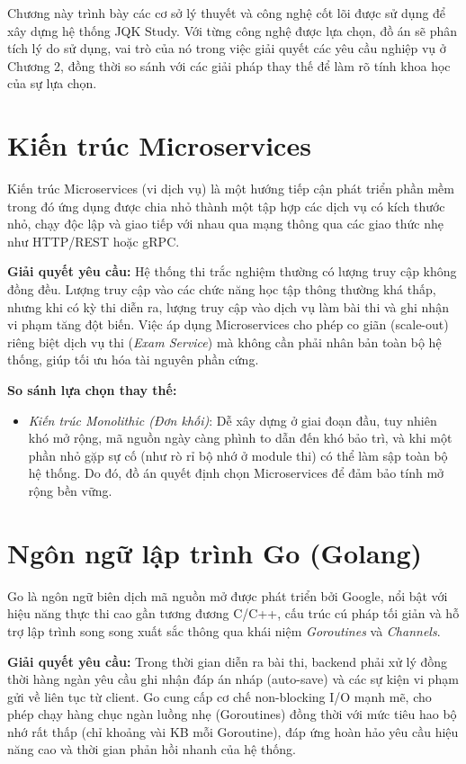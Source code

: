 \documentclass[../DoAn.tex]{subfiles}
\begin{document}
Chương này trình bày các cơ sở lý thuyết và công nghệ cốt lõi được sử dụng để xây dựng hệ thống JQK Study. Với từng công nghệ được lựa chọn, đồ án sẽ phân tích lý do sử dụng, vai trò của nó trong việc giải quyết các yêu cầu nghiệp vụ ở Chương 2, đồng thời so sánh với các giải pháp thay thế để làm rõ tính khoa học của sự lựa chọn.

\section{Kiến trúc Microservices}
\label{section:3.1}
Kiến trúc Microservices (vi dịch vụ) là một hướng tiếp cận phát triển phần mềm trong đó ứng dụng được chia nhỏ thành một tập hợp các dịch vụ có kích thước nhỏ, chạy độc lập và giao tiếp với nhau qua mạng thông qua các giao thức nhẹ như HTTP/REST hoặc gRPC. 

\textbf{Giải quyết yêu cầu:} Hệ thống thi trắc nghiệm thường có lượng truy cập không đồng đều. Lượng truy cập vào các chức năng học tập thông thường khá thấp, nhưng khi có kỳ thi diễn ra, lượng truy cập vào dịch vụ làm bài thi và ghi nhận vi phạm tăng đột biến. Việc áp dụng Microservices cho phép co giãn (scale-out) riêng biệt dịch vụ thi (\textit{Exam Service}) mà không cần phải nhân bản toàn bộ hệ thống, giúp tối ưu hóa tài nguyên phần cứng.

\textbf{So sánh lựa chọn thay thế:}
\begin{itemize}
    \item \textit{Kiến trúc Monolithic (Đơn khối)}: Dễ xây dựng ở giai đoạn đầu, tuy nhiên khó mở rộng, mã nguồn ngày càng phình to dẫn đến khó bảo trì, và khi một phần nhỏ gặp sự cố (như rò rỉ bộ nhớ ở module thi) có thể làm sập toàn bộ hệ thống. Do đó, đồ án quyết định chọn Microservices để đảm bảo tính mở rộng bền vững.
\end{itemize}

\section{Ngôn ngữ lập trình Go (Golang)}
\label{section:3.2}
Go là ngôn ngữ biên dịch mã nguồn mở được phát triển bởi Google, nổi bật với hiệu năng thực thi cao gần tương đương C/C++, cấu trúc cú pháp tối giản và hỗ trợ lập trình song song xuất sắc thông qua khái niệm \textit{Goroutines} và \textit{Channels}.

\textbf{Giải quyết yêu cầu:} Trong thời gian diễn ra bài thi, backend phải xử lý đồng thời hàng ngàn yêu cầu ghi nhận đáp án nháp (auto-save) và các sự kiện vi phạm gửi về liên tục từ client. Go cung cấp cơ chế non-blocking I/O mạnh mẽ, cho phép chạy hàng chục ngàn luồng nhẹ (Goroutines) đồng thời với mức tiêu hao bộ nhớ rất thấp (chỉ khoảng vài KB mỗi Goroutine), đáp ứng hoàn hảo yêu cầu hiệu năng cao và thời gian phản hồi nhanh của hệ thống.
\end{document}
